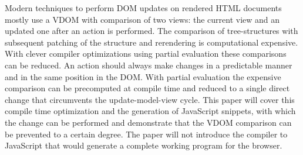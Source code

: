 Modern techniques to perform DOM updates on rendered HTML documents mostly use a VDOM with comparison of two views: the current view and an updated one after an action is performed. The comparison of tree-structures with subsequent patching of the structure and rerendering is computational expensive. With clever compiler optimizations using partial evaluation these comparisons can be reduced. An action should always make changes in a predictable manner and in the same position in the DOM. With partial evaluation the expensive comparison can be precomputed at compile time and reduced to a single direct change that circumvents the update-model-view cycle.
This paper will cover this compile time optimization and the generation of JavaScript snippets, with which the change can be performed and demonstrate that the VDOM comparison can be prevented to a certain degree. The paper will not introduce the compiler to JavaScript that would generate a complete working program for the browser.
